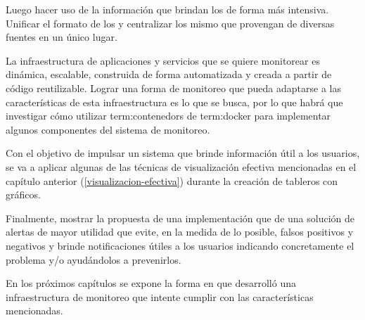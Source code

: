 Luego hacer uso de la información que brindan los  de forma más
intensiva. Unificar el formato de los  y centralizar los mismo que
provengan de diversas fuentes en un único lugar.

La infraestructura de aplicaciones y servicios que se quiere monitorear es
dinámica, escalable, construida de forma automatizada y creada a partir de
código reutilizable. Lograr una forma de monitoreo que pueda adaptarse a las
características de esta infraestructura es lo que se busca, por lo que habrá
que investigar cómo utilizar \glspl{term:contenedor} de \gls{term:docker} para
implementar algunos componentes del sistema de monitoreo.

Con el objetivo de impulsar un sistema que brinde información útil a los
usuarios, se va a aplicar algunas de las técnicas de visualización efectiva
mencionadas en el capítulo anterior (\autoref{visualizacion-efectiva}) durante
la creación de tableros con gráficos.

Finalmente, mostrar la propuesta de una implementación que de una solución de
alertas de mayor utilidad que evite, en la medida de lo posible, falsos
positivos y negativos y brinde notificaciones útiles a los usuarios indicando
concretamente el problema y/o ayudándolos a prevenirlos.

En los próximos capítulos se expone la forma en que desarrolló una
infraestructura de monitoreo que intente cumplir con las características
mencionadas.

